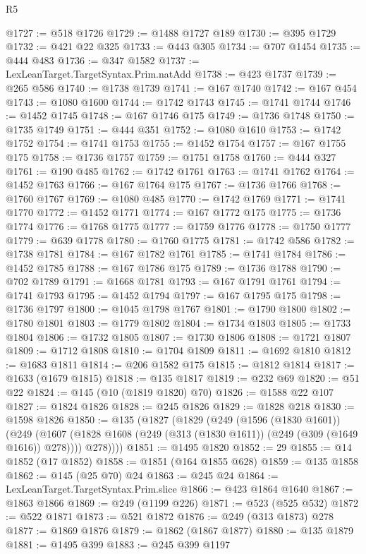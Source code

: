 \begin{lexlean}{R5}
\begin{coremodule}
@1727 := @518 @1726
@1729 := @1488 @1727 @189
@1730 := @395 @1729
@1732 := @421 @22 @325
@1733 := @443 @305
@1734 := @707 @1454
@1735 := @444 @483
@1736 := @347 @1582
@1737 := LexLeanTarget.TargetSyntax.Prim.natAdd
@1738 := @423 @1737
@1739 := @265 @586
@1740 := @1738 @1739
@1741 := @167 @1740
@1742 := @167 @454
@1743 := @1080 @1600
@1744 := @1742 @1743
@1745 := @1741 @1744
@1746 := @1452 @1745
@1748 := @167 @1746 @175
@1749 := @1736 @1748
@1750 := @1735 @1749
@1751 := @444 @351
@1752 := @1080 @1610
@1753 := @1742 @1752
@1754 := @1741 @1753
@1755 := @1452 @1754
@1757 := @167 @1755 @175
@1758 := @1736 @1757
@1759 := @1751 @1758
@1760 := @444 @327
@1761 := @190 @485
@1762 := @1742 @1761
@1763 := @1741 @1762
@1764 := @1452 @1763
@1766 := @167 @1764 @175
@1767 := @1736 @1766
@1768 := @1760 @1767
@1769 := @1080 @485
@1770 := @1742 @1769
@1771 := @1741 @1770
@1772 := @1452 @1771
@1774 := @167 @1772 @175
@1775 := @1736 @1774
@1776 := @1768 @1775
@1777 := @1759 @1776
@1778 := @1750 @1777
@1779 := @639 @1778
@1780 := @1760 @1775
@1781 := @1742 @586
@1782 := @1738 @1781
@1784 := @167 @1782 @1761
@1785 := @1741 @1784
@1786 := @1452 @1785
@1788 := @167 @1786 @175
@1789 := @1736 @1788
@1790 := @702 @1789
@1791 := @1668 @1781
@1793 := @167 @1791 @1761
@1794 := @1741 @1793
@1795 := @1452 @1794
@1797 := @167 @1795 @175
@1798 := @1736 @1797
@1800 := @1045 @1798 @1767
@1801 := @1790 @1800
@1802 := @1780 @1801
@1803 := @1779 @1802
@1804 := @1734 @1803
@1805 := @1733 @1804
@1806 := @1732 @1805
@1807 := @1730 @1806
@1808 := @1721 @1807
@1809 := @1712 @1808
@1810 := @1704 @1809
@1811 := @1692 @1810
@1812 := @1683 @1811
@1814 := @206 @1582 @175
@1815 := @1812 @1814
@1817 := @1633 (@1679 @1815)
@1818 := @135 @1817
@1819 := @232 @69
@1820 := @51 @22
@1824 := @145 (@10 (@1819 @1820) @70)
@1826 := @1588 @22 @107
@1827 := @1824 @1826
@1828 := @245 @1826
@1829 := @1828 @218
@1830 := @1598 @1826
@1850 := @135
    (@1827
      (@1829
        (@249
          (@1596 (@1830 @1601))
          (@249
            (@1607 (@1828 @1608 (@249 (@313 (@1830 @1611)) (@249 (@309 (@1649 @1616)) @278))))
            @278))))
@1851 := @1495 @1820
@1852 := 29
@1855 := @14 @1852 (@17 @1852)
@1858 := @1851 (@164 @1855 @628)
@1859 := @135 @1858
@1862 := @145 (@25 @70) @24
@1863 := @245 @24
@1864 := LexLeanTarget.TargetSyntax.Prim.slice
@1866 := @423 @1864 @1640
@1867 := @1863 @1866
@1869 := @249 (@1199 @226)
@1871 := @523 (@525 @532)
@1872 := @522 @1871
@1873 := @521 @1872
@1876 := @249 (@313 @1873) @278
@1877 := @1869 @1876
@1879 := @1862 (@1867 @1877)
@1880 := @135 @1879
@1881 := @1495 @399
@1883 := @245 @399 @1197

\end{coremodule}
\end{lexlean}
